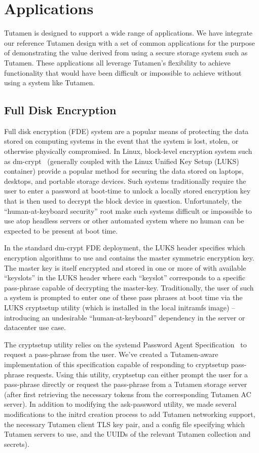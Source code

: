 \section{Applications}
\label{sec:apps}

Tutamen is designed to support a wide range of applications. We have
integrate our reference Tutamen design with a set of common
applications for the purpose of demonstrating the value derived from
using a secure storage system such as Tutamen. These applications all
leverage Tutamen's flexibility to achieve functionality that would
have been difficult or impossible to achieve without using a system
like Tutamen.

\subsection{Full Disk Encryption}

Full disk encryption (FDE) system are a popular means of protecting
the data stored on computing systems in the event that the system is
lost, stolen, or otherwise physically compromised. In Linux,
block-level encryption system such as dm-crypt~\cite{dm-crypt}
(generally coupled with the Linux Unified Key Setup (LUKS)~\cite{luks}
container) provide a popular method for securing the data stored on
laptops, desktops, and portable storage devices. Such systems
traditionally require the user to enter a password at boot-time to
unlock a locally stored encryption key that is then used to decrypt
the block device in question. Unfortunately, the ``human-at-keyboard
security'' root make such systems difficult or impossible to use atop
headless servers or other automated system where no human can be
expected to be present at boot time.

In the standard dm-crypt FDE deployment, the LUKS header specifies
which encryption algorithms to use and contains the master symmetric
encryption key. The master key is itself encrypted and stored in one
or more of with available ``keyslots'' in the LUKS header where each
``keyslot'' corresponds to a specific pass-phrase capable of
decrypting the master-key. Traditionally, the user of such a system is
prompted to enter one of these pass phrases at boot time via the LUKS
cryptsetup utility (which is installed in the local initramfs image)
-- introducing an undesirable ``human-at-keyboard'' dependency in the
server or datacenter use case.

The cryptsetup utility relies on the systemd Password Agent
Specification~\cite{systemd-passwordagents} to request a pass-phrase
from the user. We've created a Tutamen-aware implementation of this
specification capable of responding to cryptsetup pass-phrase
requests. Using this utility, cryptsetup can either prompt the user
for a pass-phrase directly or request the pass-phrase from a Tutamen
storage server (after first retrieving the necessary tokens from the
corresponding Tutamen AC server). In addition to modifying the
ask-password utility, we made several modifications to the initrd
creation process to add Tutamen networking support, the necessary
Tutamen client TLS key pair, and a config file specifying which
Tutamen servers to use, and the UUIDs of the relevant Tutamen
collection and secrets).

